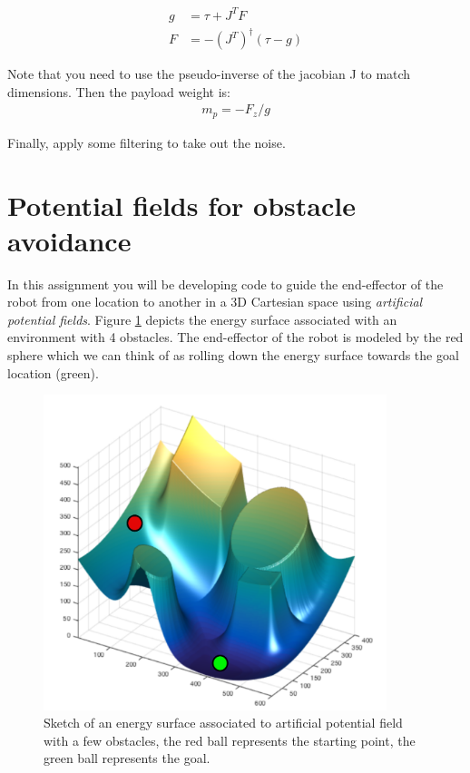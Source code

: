 \documentclass[11pt]{article}
\begin{document}
\begin{align*}
g &= \tau  + J^TF \\
F &= -(J^T)^\dagger (\tau - g) 
\end{align*}

Note that you need to use the pseudo-inverse of the jacobian J to match dimensions.  Then the payload weight is:
\begin{align*}
m_p = -F_z / g 
\end{align*}

Finally, apply some filtering to take out the noise. 




\section{Potential fields for obstacle avoidance}
In this assignment you will be developing code to guide the end-effector of the robot from one location to another in a
3D  Cartesian space using \textit{artificial potential fields}. Figure \ref{fig:pot_fields} depicts 
the energy surface associated with an  environment with 4 obstacles. The end-effector of the robot is modeled by
the red sphere which we can think of as rolling down the energy surface towards the goal location (green).


\begin{figure}[bht]
	\centering
	\includegraphics[width=10cm]{pics/pot_fields.pdf}
	\caption{Sketch of an energy surface associated to artificial potential field with a few obstacles, the red ball represents the starting point, the green ball represents the goal.}
	\label{fig:pot_fields}
\end{figure} 
\end{document}

